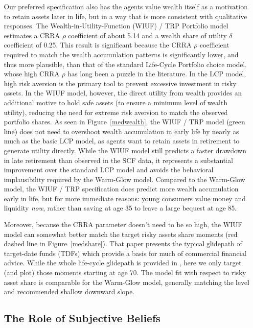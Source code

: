 \documentclass{article}
\newcommand{\CRRA}{\rho}
\begin{document}
Our preferred specification also has the agents value wealth itself as a motivation to retain assets later in life, but in a way that is more consistent with qualitative responses.
The Wealth-in-Utility-Function (WIUF) / TRP Portfolio model estimates a CRRA $\CRRA$ coefficient of about 5.14 and a wealth share of utility $\delta$ coefficient of 0.25.
This result is significant because the CRRA $\CRRA$ coefficient required to match the wealth accumulation patterns is significantly lower, and thus more plausible, than that of the standard Life-Cycle Portfolio choice model, whose high CRRA $\CRRA$ has long been a puzzle in the literature. In the LCP model, high risk aversion is the primary tool to prevent excessive investment in risky assets. In the WIUF model, however, the direct utility from wealth provides an additional motive to hold safe assets (to ensure a minimum level of wealth utility), reducing the need for extreme risk aversion to match the observed portfolio shares.
As seen in Figure~\ref{medwealth}, the WIUF / TRP model (green line) does not need to overshoot wealth accumulation in early life by nearly as much as the basic LCP model, as agents want to retain assets in retirement to generate utility directly. While the WIUF model still predicts a faster drawdown in late retirement than observed in the SCF data, it represents a substantial improvement over the standard LCP model and avoids the behavioral implausibility required by the Warm-Glow model.
Compared to the Warm-Glow model, the WIUF / TRP specification does predict more wealth accumulation early in life, but for more immediate reasons: young consumers value money and liquidity \textit{now}, rather than saving at age 35 to leave a large bequest at age 85.

Moreover, because the CRRA parameter doesn't need to be so high, the WIUF model can somewhat better match the target risky assets share moments (red dashed line in Figure~\ref{medshare}).
That paper presents the typical glidepath of target-date funds (TDFs) which provide a basis for much of commercial financial advice.
While the whole life-cycle glidepath is provided in \cite{Aboagye2024}, here we only target (and plot) those moments starting at age 70.
The model fit with respect to risky asset share is comparable for the Warm-Glow model, generally matching the level and recommended shallow downward slope.

\subsection{The Role of Subjective Beliefs}
\end{document}
